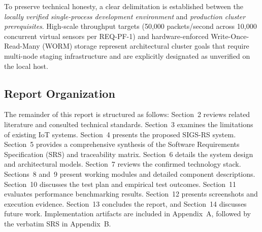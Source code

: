 To preserve technical honesty, a clear delimitation is established between the \emph{locally verified single-process development environment} and \emph{production cluster prerequisites}. High-scale throughput targets (50,000 packets/second across 10,000 concurrent virtual sensors per REQ-PF-1) and hardware-enforced Write-Once-Read-Many (WORM) storage represent architectural cluster goals that require multi-node staging infrastructure and are explicitly designated as unverified on the local host.

\subsection{Report Organization}
The remainder of this report is structured as follows: Section~2 reviews related literature and consulted technical standards. Section~3 examines the limitations of existing IoT systems. Section~4 presents the proposed SIGS-RS system. Section~5 provides a comprehensive synthesis of the Software Requirements Specification (SRS) and traceability matrix. Section~6 details the system design and architectural models. Section~7 reviews the confirmed technology stack. Sections~8 and~9 present working modules and detailed component descriptions. Section~10 discusses the test plan and empirical test outcomes. Section~11 evaluates performance benchmarking results. Section~12 presents screenshots and execution evidence. Section~13 concludes the report, and Section~14 discusses future work. Implementation artifacts are included in Appendix~A, followed by the verbatim SRS in Appendix~B.
